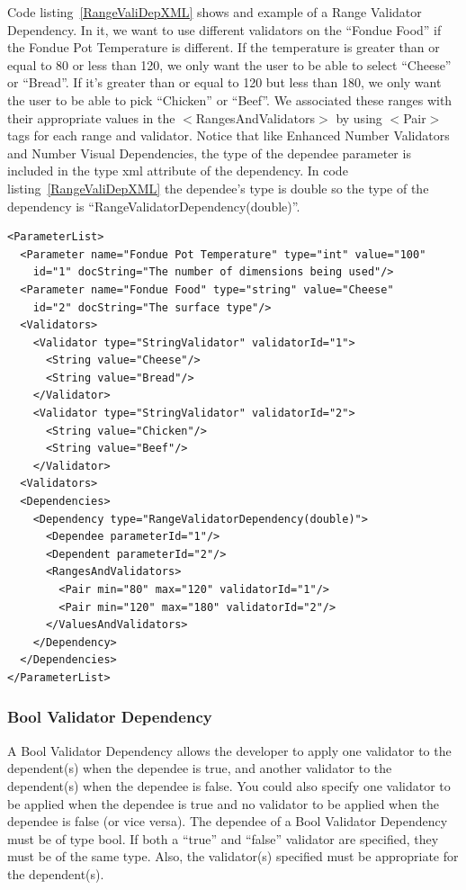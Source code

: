 Code listing~\ref{RangeValiDepXML} shows and example of a Range Validator Dependency. In it, we want to use different validators
on the ``Fondue Food'' if the Fondue Pot Temperature is different. If the temperature is greater than or equal to 80 or less than 120,
we only want the user to be able to select ``Cheese'' or ``Bread''. If it's greater than or equal to 120 but less than 180, we only want the
user to be able to pick ``Chicken'' or ``Beef''. We associated these ranges with their appropriate values in the $<$RangesAndValidators$>$ by
using $<$Pair$>$ tags for each range and validator. Notice that like Enhanced Number Validators and Number Visual Dependencies, the type of the dependee parameter is 
included in the type xml attribute of the dependency. In code listing~\ref{RangeValiDepXML} the dependee's type is double so the type of the dependency is 
``RangeValidatorDependency(double)''.
\begin{lstlisting}[caption={Example usage of a Range Validator Dependency}, label=RangeValiDepXML]
<ParameterList>
  <Parameter name="Fondue Pot Temperature" type="int" value="100"
    id="1" docString="The number of dimensions being used"/>
  <Parameter name="Fondue Food" type="string" value="Cheese"
    id="2" docString="The surface type"/>
  <Validators>
    <Validator type="StringValidator" validatorId="1">
      <String value="Cheese"/>
      <String value="Bread"/>
    </Validator>
    <Validator type="StringValidator" validatorId="2">
      <String value="Chicken"/>
      <String value="Beef"/>
    </Validator>
  <Validators>
  <Dependencies>
    <Dependency type="RangeValidatorDependency(double)">
      <Dependee parameterId="1"/>
      <Dependent parameterId="2"/>
      <RangesAndValidators>
        <Pair min="80" max="120" validatorId="1"/>
        <Pair min="120" max="180" validatorId="2"/>
      </ValuesAndValidators>
    </Dependency>
  </Dependencies>
</ParameterList>
\end{lstlisting}

\subsubsection{Bool Validator Dependency}
A Bool Validator Dependency allows the developer to apply one validator to the dependent(s) when the dependee is true, and another validator
to the dependent(s) when the dependee is false. You could also specify one validator to be applied when the dependee is true and no validator
to be applied when the dependee is false (or vice versa). The dependee of a Bool Validator Dependency must be of type bool. If both a ``true'' and
``false'' validator are specified, they must be of the same type. Also, the validator(s) specified must be appropriate for the dependent(s).

